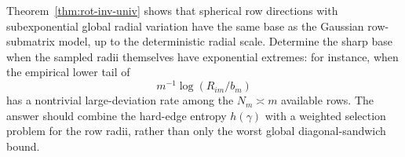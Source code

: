 \begin{problem}\label{prob:radial-mixture}
Theorem~\ref{thm:rot-inv-univ} shows that spherical row directions with
subexponential global radial variation have the same base as the Gaussian
row-submatrix model, up to the deterministic radial scale.  Determine the sharp
base when the sampled radii themselves have exponential extremes: for instance,
when the empirical lower tail of
\[
  m^{-1}\log(R_{im}/b_m)
\]
has a nontrivial large-deviation rate among the \(N_m\asymp m\) available rows.
The answer should combine the hard-edge entropy \(h(\gamma)\) with a weighted
selection problem for the row radii, rather than only the worst global
diagonal-sandwich bound.
\end{problem}
